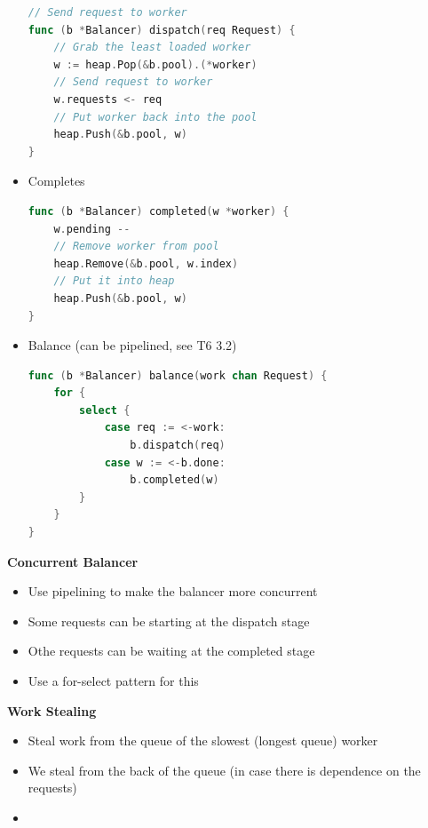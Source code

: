 \documentclass[10pt, landscape]{article}
\begin{document}
\begin{multicols}{4}
\begin{itemize}
\begin{lstlisting}[language=Go, breaklines=true, breakatwhitespace=true]
// Send request to worker 
func (b *Balancer) dispatch(req Request) {
    // Grab the least loaded worker
    w := heap.Pop(&b.pool).(*worker)
    // Send request to worker
    w.requests <- req
    // Put worker back into the pool
    heap.Push(&b.pool, w)
}
    \end{lstlisting}
    \item Completes
    \begin{lstlisting}[language=Go, breaklines=true, breakatwhitespace=true]
func (b *Balancer) completed(w *worker) {
    w.pending -- 
    // Remove worker from pool
    heap.Remove(&b.pool, w.index)
    // Put it into heap 
    heap.Push(&b.pool, w)
}
    \end{lstlisting}
\item Balance (can be pipelined, see T6 3.2)
\begin{lstlisting}[language=Go, breaklines=true, breakatwhitespace=true]
func (b *Balancer) balance(work chan Request) {
    for {
        select {
            case req := <-work:
                b.dispatch(req)
            case w := <-b.done:
                b.completed(w)
        }
    }
}
\end{lstlisting}
\end{itemize}

\textbf{Concurrent Balancer} \\ 
\begin{itemize}
    \item Use pipelining to make the balancer more concurrent 
    \item Some requests can be starting at the dispatch stage 
    \item Othe requests can be waiting at the completed stage 
    \item Use a for-select pattern for this
\end{itemize}

\textbf{Work Stealing} \\
\begin{itemize}
    \item Steal work from the queue of the slowest (longest queue) worker 
    \item We steal from the back of the queue (in case there is dependence on the requests)
    \item 
\end{itemize}


\end{multicols}
\end{document}
